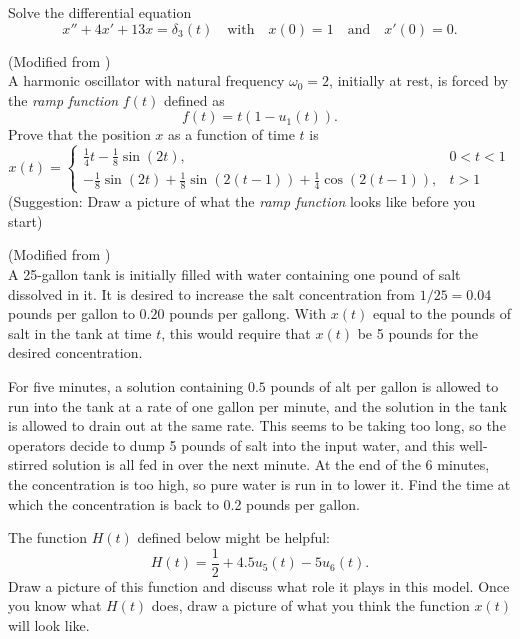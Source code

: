 \begin{problem}
    Solve the differential equation
    \[ x'' +4x' + 13x = \delta_3(t)  \quad \text{with} \quad x(0)=1 \quad \text{and} \quad
    x'(0) =0. \]
\end{problem}


\begin{problem}
    (Modified from \cite{Noonburg}) \\
    A harmonic oscillator with natural frequency $\omega_0 = 2$, initially at rest, is
    forced by the {\it ramp function} $f(t)$ defined as
    \[ f(t) = t(1 - u_1(t)). \]
    Prove that the position $x$ as a function of time $t$ is 
    \[ x(t) = \left\{ \begin{array}{ll} \frac{1}{4} t - \frac{1}{8} \sin(2t), & 0 < t < 1 \\
                -\frac{1}{8} \sin(2t) + \frac{1}{8} \sin(2(t-1)) + \frac{1}{4}
                \cos(2(t-1)), & t > 1
    \end{array}  \right. \]
    (Suggestion: Draw a picture of what the {\it ramp function} looks like before you
    start)
\end{problem}


\begin{problem}
    (Modified from \cite{Noonburg}) \\
    A 25-gallon tank is initially filled with water containing one pound of salt dissolved
    in it.  It is desired to increase the salt concentration from $1/25=0.04$ pounds per gallon
    to $0.20$ pounds per gallong.  With $x(t)$ equal to the pounds of salt in the tank at
    time $t$, this would require that $x(t)$ be 5 pounds for the desired concentration.  

    For five minutes, a solution containing $0.5$ pounds of alt per gallon is allowed to
    run into the tank at a rate of one gallon per minute, and the solution in the tank is
    allowed to drain out at the same rate.  This seems to be taking too long, so the
    operators decide to dump 5 pounds of salt into the input water, and this well-stirred
    solution is all fed in over the next minute.  At the end of the 6 minutes, the
    concentration is too high, so pure water is run in to lower it.  Find the time at
    which the concentration is back to 0.2 pounds per gallon.

    The function $H(t)$ defined below might be helpful:
    \[ H(t) = \frac{1}{2} + 4.5 u_5(t) - 5u_6(t). \]
    Draw a picture of this function and discuss what role it plays in this model.  Once
    you know what $H(t)$ does, draw a picture of what you think the function $x(t)$ will
    look like.
\end{problem}


